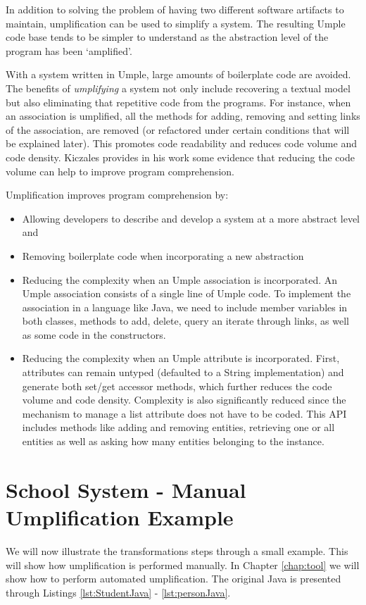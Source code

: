 In addition to solving the problem of having two different software artifacts to maintain,   umplification can be used to simplify a system. The resulting Umple code base tends to be simpler to understand \cite{UmpleMAIN} as the abstraction level of the program has been `amplified'.

With a system written in Umple, large amounts of boilerplate code are avoided. The benefits of \textit{umplifying} a system not only include recovering a textual model but also eliminating that repetitive code from the programs. For instance, when an association is umplified, all the methods for adding, removing and setting links of the association, are removed (or refactored under certain conditions that will be explained later). This promotes code readability and reduces code volume and code density. Kiczales provides in his work \cite{kiczalesAOP} some evidence that reducing the code volume can help to improve program comprehension.

Umplification improves program comprehension by:
\begin{itemize}
\item Allowing developers to describe and develop a system at a more abstract level and

\item Removing boilerplate code when incorporating a new abstraction

\item Reducing the complexity when an Umple association is incorporated. An Umple association consists of a single line of Umple code. To implement the association in a language like Java, we need to include member variables in both classes, methods to add, delete, query an iterate through links, as well as some code in the constructors.

\item Reducing the complexity when an Umple attribute is incorporated. First, attributes can remain untyped (defaulted to a String implementation) and generate both set/get accessor methods, which further reduces the code volume and code density. Complexity is also significantly reduced since the mechanism to manage a list attribute does not have to be coded. This API includes methods like adding and removing entities, retrieving one or all entities as well as asking how many entities belonging to the instance.
\end{itemize}

\section{School System - Manual Umplification Example}
We will now illustrate the transformations steps through a small example. This will show how umplification is performed manually. In Chapter \ref{chap:tool} we will show how to perform automated umplification. The original Java is presented through Listings \ref{lst:StudentJava} - \ref{lst:personJava}.

